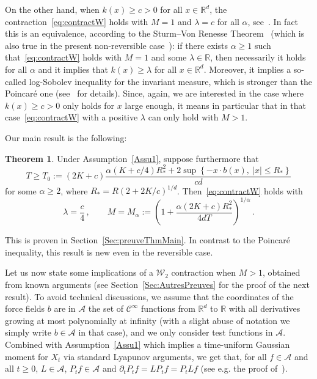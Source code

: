 \documentclass[10pt]{amsart}
\theoremstyle{definition}\newtheorem{defi}[theo]{Definition}\newtheorem{rema}[theo]{Remark}\newtheorem{exam}[theo]{Example}\newtheorem{exem}[theo]{Example}\newtheorem{nota}[theo]{Notation}
\newcommand{\R}{\mathbb R}
\newcommand{\A}{\mathcal A}
\newcommand{\clC}{\mathcal C}
\newcommand{\clW}{\mathcal W}
\newcommand{\1}{\mathbbm{1}}
\newcommand{\nv}[1]{#1}
\newtheorem{thm}[theo]{Theorem}
\begin{document}
On the other hand, when $k(x) \geqslant c >0$ for all $x\in\R^d$, the contraction~\eqref{eq:contractW} holds with $M=1$ and $\lambda=c$ for all $\alpha$, see~\cite{MonmarcheContraction}. In fact this is an equivalence\nv{, according to the Sturm--Von Renesse Theorem~\cite{VonRenesseSturm} (which is also true in the present non-reversible case~\cite{MonmarcheContraction}):} if there exists $\alpha\geqslant 1$ such that~\eqref{eq:contractW} holds with $M=1$ and some $\lambda\in\R$, then necessarily it holds for all $\alpha$ and it implies that $k(x) \geqslant \lambda$ for all $x\in\R^d$. \nv{Moreover, it implies a so-called log-Sobolev inequality for the invariant measure, which is stronger than the Poincaré one (see~\cite{MonmarcheContraction} for details)}. \nv{Since,} again, we are interested in the case where $k(x)\geqslant c>0$ only holds for $x$ large enough, it means in particular that in that case~\eqref{eq:contractW} with a positive $\lambda$ can only hold with $M>1$.


Our main result is the following:
\begin{thm}\label{Thm:main}
Under Assumption~\ref{Assu1}, suppose furthermore that
\begin{equation}\label{eq:conditionT}
T\geqslant T_0:=(2K+c)\frac{ \alpha (K+c/4)R_*^2 +2 \sup\left\{-x\cdot b(x),\ |x|\leqslant R_*\right\}}{cd}
\end{equation}
for some $\alpha \geqslant 2$, where $R_*=R( 2+2K/c)^{1/d}$. Then~\eqref{eq:contractW} holds with
\[
\lambda = \frac c4 \,, \qquad M= M_\alpha := \left( 1+ \frac{\alpha (2K+c)R_*^2}{4dT}\right)^{1/\alpha}\,.
\]
\end{thm}

This is proven in Section~\ref{Sec:preuveThmMain}. In contrast to the Poincaré inequality, this result is new even in the reversible case.


Let us now state some implications of a $\clW_2$ contraction when $M>1$, obtained from known arguments (see Section~\ref{Sec:AutresPreuves} for the proof of the next result). To avoid technical discussions, we assume that the coordinates of the force fields $b$ are in $\A$ the set of $\clC^\infty$ functions from $\R^d$ to $\R$ with all derivatives growing at most polynomially at infinity (with a slight abuse of notation we simply write $b\in\A$ in that case), and we only consider test functions in $\A$. Combined with Assumption~\ref{Assu1} which implies a time-uniform Gaussian moment for $X_t$ via standard Lyapunov arguments, we get that, for all $f\in\A$ and all $t\geqslant 0$, $L\in\A$, $P_t f\in \A$ and $\partial_t P_t f = LP_t f = P_t Lf$ (see e.g. the proof of~\cite[Theorem~2.5]{EthierKurtz}).
\end{document}
